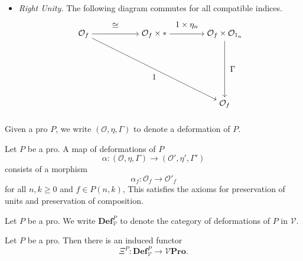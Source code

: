 \documentclass{tac}
\begin{document}
\begin{definition}
\begin{itemize}
\[\begin{tikzpicture}[node distance=3cm, auto]
        \node (A) {$\mathcal{O}_{f}$};
       \node (B)[right of=A]{$*\times\mathcal{O}_{f}$};
       \node (C)[right of=B]{$\mathcal{O}_{1_k}\times\mathcal{O}_{f}$};
       \node (D)[below of=C]{$\mathcal{O}_{f}$};
       \draw[->] (A) to node[above=3]{$\cong$}(B);
       \draw[->] (B) to node[above=3]{$\eta_{k}\times 1$}(C);
       \draw[->](C) to node[right=3]{$\Gamma$}(D);
       \draw[->](A) to node[below=3]{$1$} (D);
    \end{tikzpicture}
\]
\item \emph{Right Unity.} The following diagram commutes for all 
compatible indices.
\[
  \begin{tikzpicture}[node distance=3cm, auto]
        \node (A) {$\mathcal{O}_{f}$};
       \node (B)[right of=A]{$\mathcal{O}_{f}\times *$};
       \node (C)[right of=B]{$\mathcal{O}_{f}\times \mathcal{O}_{1_n}$};
       \node (D)[below of=C]{$\mathcal{O}_{f}$};
       \draw[->] (A) to node[above=3]{$\cong$}(B);
       \draw[->] (B) to node[above=3]{$1\times\eta_{n}$}(C);
       \draw[->](C) to node[right=3]{$\Gamma$}(D);
       \draw[->](A) to node[below=3]{$1$} (D);
    \end{tikzpicture}
\]
\end{itemize}
\end{definition}


Given a pro $P$, we write $(\mathcal{O},\eta,\Gamma)$ to denote a deformation of $P$.

\begin{definition}
Let $P$ be a pro. A map of deformations of $P$
\[
\alpha:(\mathcal{O},\eta,\Gamma)\to (\mathcal{O}',\eta',\Gamma')
\]
consists of a morphism
\[
\alpha_{f}:\mathcal{O}_{f}\to \mathcal{O}'_{f}
\]
for all $n,k\geq 0$ and $f\in P(n,k)$, This satisfies the axioms for preservation of units and preservation of composition.
\end{definition}

Let $P$ be a pro. We write $\mathbf{Def}^P_\mathcal{V}$ to denote the category of deformations of $P$ in $\mathcal{V}$.

\begin{proposition}
Let $P$ be a pro. Then there is an induced functor 
\[
\Xi^P:\mathbf{Def}^P_\mathcal{V}\to \mathcal{V}\mathbf{Pro}.
\]
\end{proposition}
\end{document}
